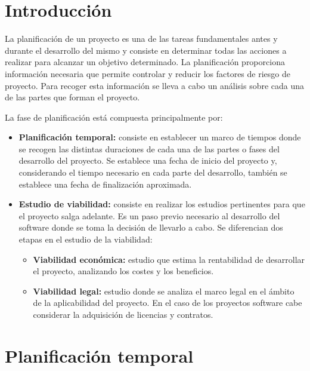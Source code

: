 
\section{Introducción}

La planificación de un proyecto es una de las tareas fundamentales antes y durante el desarrollo del mismo y consiste en determinar todas las acciones a realizar para alcanzar un objetivo determinado. La planificación proporciona información necesaria que permite controlar y reducir los factores de riesgo de proyecto. Para recoger esta información se lleva a cabo un análisis sobre cada una de las partes que forman el proyecto. 

La fase de planificación está compuesta principalmente por:

\begin{itemize}
\tightlist
\item
  \textbf{Planificación temporal:} consiste en establecer un marco de tiempos donde se recogen las distintas duraciones de cada una de las partes o fases del desarrollo del proyecto. Se establece una fecha de inicio del proyecto y, considerando el tiempo necesario en cada parte del desarrollo, también se establece una fecha de finalización aproximada.
  
\item
  \textbf{Estudio de viabilidad:} consiste en realizar los estudios pertinentes para que el proyecto salga adelante. Es un paso previo necesario al desarrollo del software donde se toma la decisión de llevarlo a cabo. Se diferencian dos etapas en el estudio de la viabilidad:  
  \begin{itemize}
  \tightlist
  \item
  	\textbf{Viabilidad económica:} estudio que estima la rentabilidad de desarrollar el proyecto, analizando los costes y los beneficios.
  \item
  	\textbf{Viabilidad legal:} estudio donde se analiza el marco legal en el ámbito de la aplicabilidad del proyecto. En el caso de los proyectos software cabe considerar la adquisición de licencias y contratos.
  \end{itemize}
\end{itemize}

\section{Planificación temporal}

